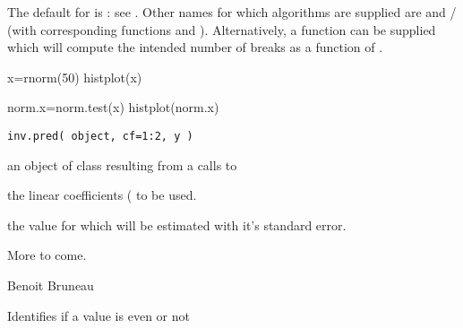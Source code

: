 \documentclass[a4paper]{book}
\begin{document}
%
\begin{Details}\relax
The default for  is : see
.  Other names for which algorithms
are supplied are  and  /
 (with corresponding functions
 and ).
Alternatively, a function can be supplied which
will compute the intended number of breaks as a function of .
\end{Details}
%
\begin{SeeAlso}\relax
{}
\end{SeeAlso}
%
\begin{Examples}
\begin{ExampleCode}
x=rnorm(50)
histplot(x)

norm.x=norm.test(x)
histplot(norm.x)  
\end{ExampleCode}
\end{Examples}
\newpage
{}
%
\begin{Usage}
\begin{verbatim}
inv.pred( object, cf=1:2, y )
\end{verbatim}
\end{Usage}
%
\begin{Arguments}
\begin{ldescription}
\item[\code{object}] an object of class  resulting from a
calls to 

\item[\code{cf}] the linear coefficients ( to be used. 

\item[\code{y}] the  value for which  will be estimated with it's standard error.

\end{ldescription}
\end{Arguments}
%
\begin{Details}\relax
More to come. 
\end{Details}
%
\begin{Author}\relax
Benoit Bruneau
\end{Author}
\newpage
{}
%
\begin{Description}\relax
Identifies if a value is even or not
\end{Description}
\end{document}

